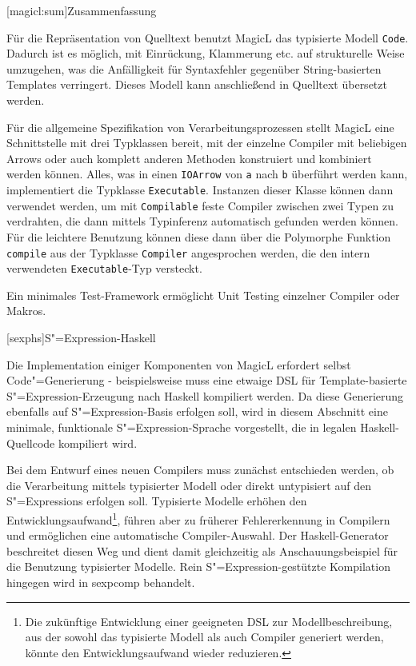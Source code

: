 \documentclass[11pt, a4paper, bibgerm]{scrbook}
\newcommand\icode[1]{\lstinline?#1?}
\newcommand\lchapter{}
\newcommand\lsection{}
\newcommand\cref{}
\newcommand{\sexp}{S"=Expression}
\newcommand{\sexps}{S"=Expressions}
\newcommand{\cgen}{Code"=Generierung}
\begin{document}
\lsection[magicl:sum]{Zusammenfassung}

Für die Repräsentation von Quelltext benutzt MagicL das typisierte
Modell \icode{Code}. Dadurch ist es möglich, mit Einrückung, Klammerung
etc. auf strukturelle Weise umzugehen, was die Anfälligkeit für
Syntaxfehler gegenüber String-basierten Templates verringert. Dieses
Modell kann anschließend in Quelltext übersetzt werden.

Für die allgemeine Spezifikation von Verarbeitungsprozessen stellt
MagicL eine Schnittstelle mit drei Typklassen bereit, mit der einzelne
Compiler mit beliebigen Arrows oder auch komplett anderen Methoden
konstruiert und kombiniert werden können. Alles, was in einen
\icode{IOArrow} von \icode{a} nach \icode{b} überführt werden kann,
implementiert die Typklasse \icode{Executable}. Instanzen dieser Klasse
können dann verwendet werden, um mit \icode{Compilable} feste Compiler
zwischen zwei Typen zu verdrahten, die dann mittels Typinferenz
automatisch gefunden werden können. Für die leichtere Benutzung können
diese dann über die Polymorphe Funktion \icode{compile} aus der
Typklasse \icode{Compiler} angesprochen werden, die den intern
verwendeten \icode{Executable}-Typ versteckt.

Ein minimales Test-Framework ermöglicht Unit Testing einzelner Compiler
oder Makros.

\lchapter[sexphs]{\sexp{}-Haskell}

Die Implementation einiger Komponenten von MagicL erfordert selbst
\cgen{} - beispielsweise muss eine etwaige DSL für Template-basierte
\sexp{}-Erzeugung nach Haskell kompiliert werden. Da diese Generierung
ebenfalls auf \sexp{}-Basis erfolgen soll, wird in diesem Abschnitt
eine minimale, funktionale \sexp{}-Sprache vorgestellt, die in legalen
Haskell-Quellcode kompiliert wird.

Bei dem Entwurf eines neuen Compilers muss zunächst entschieden
werden, ob die Verarbeitung mittels typisierter Modell oder direkt
untypisiert auf den \sexps{} erfolgen soll. Typisierte Modelle erhöhen
den Entwicklungsaufwand\footnote{Die zukünftige Entwicklung einer
  geeigneten DSL zur Modellbeschreibung, aus der sowohl das typisierte
  Modell als auch Compiler generiert werden, könnte den
  Entwicklungsaufwand wieder reduzieren.}, führen aber zu früherer
Fehlererkennung in Compilern und ermöglichen eine automatische
Compiler-Auswahl. Der Haskell-Generator beschreitet diesen Weg und
dient damit gleichzeitig als Anschauungsbeispiel für die Benutzung
typisierter Modelle. Rein \sexp{}-gestützte Kompilation hingegen wird
in \cref{sexpcomp} behandelt.
\end{document}
